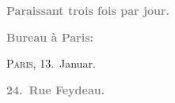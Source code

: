 \pstart
           \begin{otherlanguage}{french}\textcolor{gray}{\textbf{\textbf{Paraissant trois fois par jour.}}}\end{otherlanguage}\pend
           
\pstart
           \begin{otherlanguage}{french}\textcolor{gray}{\textbf{\textbf{Bureau à Paris:}}}\end{otherlanguage}\hfill \textsc{Paris}, 13. Januar.\pend
           
\pstart
           \begin{otherlanguage}{french}\textcolor{gray}{\textbf{\textbf{24. Rue Feydeau.}}}\end{otherlanguage}\pend
           
